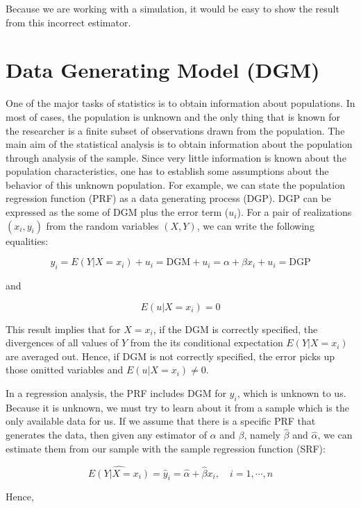 \documentclass[
]{book}
\begin{document}
Because we are working with a simulation, it would be easy to show the result from this incorrect estimator.

\hypertarget{data-generating-model-dgm}{%
\section{Data Generating Model (DGM)}\label{data-generating-model-dgm}}

One of the major tasks of statistics is to obtain information about populations. In most of cases, the population is unknown and the only thing that is known for the researcher is a finite subset of observations drawn from the population. The main aim of the statistical analysis is to obtain information about the population through analysis of the sample. Since very little information is known about the population characteristics, one has to establish some assumptions about the behavior of this unknown population. For example, we can state the population regression function (PRF) as a data generating process (DGP). DGP can be expressed as the some of DGM plus the error term (\(u_i\)). For a pair of realizations \((x_i,y_i)\) from the random variables \((X,Y)\), we can write the following equalities:

\[
y_{i}=E\left(Y | X=x_{i}\right)+u_{i}=\text{DGM} + u_{i} = \alpha+\beta x_{i}+u_{i} =\text{DGP}
\]

and

\[
E\left(u | X=x_{i}\right)=0
\]

This result implies that for \(X=x_i\), if the DGM is correctly specified, the divergences of all values of \(Y\) from the its conditional expectation \(E(Y\vert X=x_i)\) are averaged out. Hence, if DGM is not correctly specified, the error picks up those omitted variables and \(E\left(u | X=x_{i}\right)\neq0\).

In a regression analysis, the PRF includes DGM for \(y_i\), which is unknown to us. Because it is unknown, we must try to learn about it from a sample which is the only available data for us. If we assume that there is a specific PRF that generates the data, then given any estimator of \(\alpha\) and \(\beta\), namely \(\hat{\beta}\) and \(\hat{\alpha}\), we can estimate them from our sample with the sample regression function (SRF):

\[
\widehat{E\left(Y | X=x_{i}\right)}=\hat{y}_{i}=\hat{\alpha}+\hat{\beta} x_{i}, \quad i=1, \cdots, n
\]

Hence,
\end{document}
